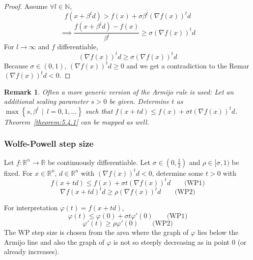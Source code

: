 \documentclass[a4paper]{article}
\numberwithin{lecref}{subsection}
\newtheorem*{Remark}{Remark}
\newcommand{\SetDef}[2]{\left\{#1\,\mid\,#2\right\}}
\begin{document}
\begin{proof}
	Assume $\forall l \in \mathbb N$,
	\[ f(x + \beta^l d) > f(x) + \sigma \beta^l\left(\nabla f(x)\right)^t d \]
	\[ \implies \frac{f(x + \beta^l d) - f(x)}{\beta^l} \geq \sigma \left(\nabla f(x)\right)^t d \]
	For $l \to \infty$ and $f$ differentiable,
	\[ (\nabla f(x))^t d \geq \sigma (\nabla f(x))^t d \]
	Because $\sigma \in (0, 1)$, $(\nabla f(x))^t d \geq 0$ and we get a contradiction to the Remar $(\nabla f(x))^t d < 0$.
\end{proof}

\begin{Remark}
	Often a more generic version of the Armijo rule is used: Let an additional scaling parameter $s > 0$ be given.
	Determine $t$ as $\max\SetDef{s, \beta^l}{l = 0, 1, \dots}$ such that $f(x + td) \leq f(x) + \sigma t\left(\nabla f(x)\right)^t d$.
	Theorem~\ref{theorem:5.4.1} can be mapped as well.
\end{Remark}

\subsubsection{Wolfe-Powell step size}
\label{section:5.4.2}

Let $f: \mathbb R^n \to \mathbb R$ be continuously differentiable. Let $\sigma \in (0, \frac12)$ and $\rho \in [\sigma, 1)$ be fixed.
For $x \in \mathbb R^n$, $d \in \mathbb R^n$ with $\left(\nabla f(x)\right)^t d < 0$, determine some $t > 0$ with
\[ f(x + td) \leq f(x) + \sigma t \left(\nabla f(x)\right)^t d \qquad \text{(WP1)} \]
\[ \nabla f(x + td)^t d \geq \rho \left(\nabla f(x)\right)^t d \qquad \text{(WP2)} \]

For interpretation $\varphi(t) = f(x + td)$,
\[ \varphi(t) \leq \varphi(0) + \sigma t \varphi'(0) \qquad \text{(WP1)} \]
\[ \varphi'(t) \geq \rho \varphi'(0) \qquad \text{(WP2)} \]
The WP step size is chosen from the area where
the graph of $\varphi$ lies below the Armijo line and also the graph of $\varphi$ is not so steeply decreasing as in point $0$ (or already increases).
\end{document}
